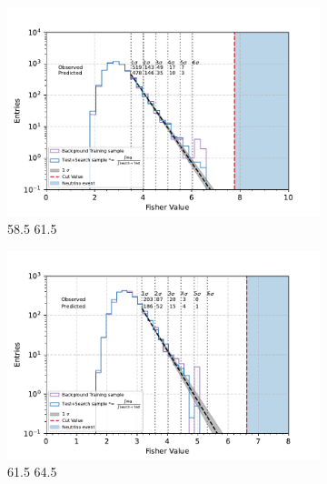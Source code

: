 \begin{figure}[h!]
  \centering
   \begin{subfigure}[l]{.48\textwidth}
     \centering
     \includegraphics[width=\linewidth]{thesis_figures/Nu_analysis/Fisher_plots/Fisher_fit_search+test_bkg_region_58.5_61.5.pdf}
     \caption{58.5 61.5}
     \label{fig:58.5-61.5}
   \end{subfigure}
   \begin{subfigure}[r]{.48\textwidth}
     \centering
     \includegraphics[width=\linewidth]{thesis_figures/Nu_analysis/Fisher_plots/Fisher_fit_search+test_bkg_region_61.5_64.5.pdf}
     \caption{61.5 64.5}
    \end{subfigure}
    \hfill
    \begin{subfigure}[l]{.48\textwidth}
      \centering

\end{subfigure}
\end{figure}

